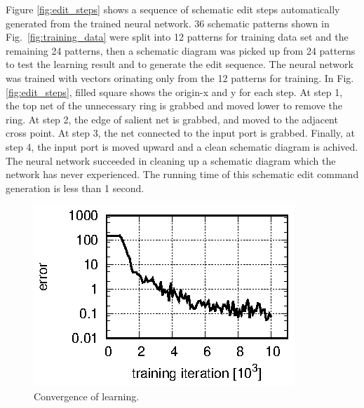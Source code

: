 \documentclass[twocolumn]{article}
\begin{document}
Figure \ref{fig:edit_steps} shows a sequence of schematic edit steps
automatically generated from the trained neural network.
36 schematic patterns shown in Fig.\ \ref{fig:training_data}
were split into 12 patterns for training data set
and the remaining 24 patterns,
then a schematic diagram was picked up
from 24 patterns to test the learning result
and to generate the edit sequence.
The neural network was trained with vectors
orinating only from the 12 patterns for training.
In Fig. \ref{fig:edit_steps}, filled square shows the origin-x and y
for each step.
At step 1, the top net of the unnecessary ring is grabbed and moved lower
to remove the ring.
At step 2, the edge of salient net is grabbed,
and moved to the adjacent cross point.
At step 3, the net connected to the input port is grabbed.
Finally, at step 4, the input port is moved upward
and a clean schematic diagram is achived.
The neural network succeeded in cleaning up a schematic diagram
which the network has never experienced.
The running time of this schematic edit command generation
is less than 1 second.

\begin{figure}[!tp]
 \begin{center}
  \begin{minipage}{\hsize}
   \includegraphics[width=\hsize]{fig/errors_02.eps}
   \caption{Convergence of learning.}
   \label{fig:errors}
  \end{minipage}
 \end{center}
\end{figure}
\end{document}
